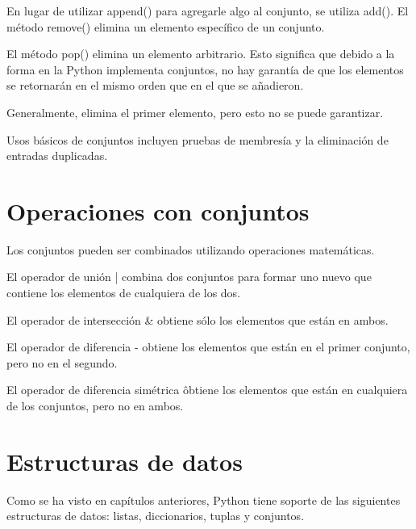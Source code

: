 \documentclass{report}
\begin{document}
{En lugar de utilizar append() para agregarle algo al conjunto, se utiliza add(). El método remove() elimina un elemento específico de un conjunto.


El método pop() elimina un elemento arbitrario. Esto significa que debido a la forma en la Python implementa conjuntos, no hay garantía de que los elementos se retornarán en el mismo orden que en el que se añadieron.

Generalmente, elimina el primer elemento, pero esto no se puede garantizar.


Usos básicos de conjuntos incluyen pruebas de membresía y la eliminación de entradas duplicadas.

\section{Operaciones con conjuntos}

Los conjuntos pueden ser combinados utilizando operaciones matemáticas.

El operador de unión | combina dos conjuntos para formar uno nuevo que contiene los elementos de cualquiera de los dos.


El operador de intersección \& obtiene sólo los elementos que están en ambos.


El operador de diferencia - obtiene los elementos que están en el primer conjunto, pero no en el segundo.


El operador de diferencia simétrica \^ obtiene los elementos que están en cualquiera de los conjuntos, pero no en ambos.


\section{Estructuras de datos}


Como se ha visto en capítulos anteriores, Python tiene soporte de las siguientes estructuras de datos: listas, diccionarios, tuplas y conjuntos.

}
\end{document}
